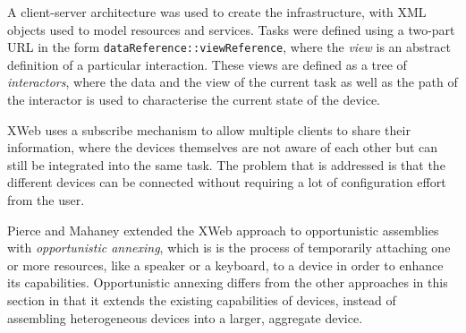 A client-server architecture was used to create the infrastructure, with \ac{XML} objects used to model resources and services. Tasks were defined using a two-part \ac{URL} in the form \texttt{dataReference\-::viewReference}, where the \emph{view} is an abstract definition of a particular interaction. These views are defined as a tree of \emph{interactors}, where the data and the view of the current task as well as the path of the interactor is used to characterise the current state of the device.

XWeb uses a subscribe mechanism to allow multiple clients to share their information, where the devices themselves are not aware of each other but can still be integrated into the same task. The problem that is addressed is that the different devices can be connected without requiring a lot of configuration effort from the user.

Pierce and Mahaney \cite{Pierce2003} extended the XWeb approach to opportunistic assemblies with \emph{opportunistic annexing}, which is is the process of temporarily attaching one or more resources, like a speaker or a keyboard, to a device in order to enhance its capabilities. Opportunistic annexing differs from the other approaches in this section in that it extends the existing capabilities of devices, instead of assembling heterogeneous devices into a larger, aggregate device. %


% 	

